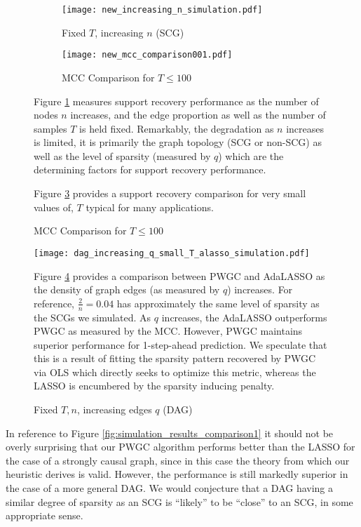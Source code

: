 \begin{figure}
  \centering
  \caption{PWGC Scaling and Small Sample Performance}
  \label{fig:simulation_results_scaling_and_small_T}
  \begin{subfigure}[b]{0.45\textwidth}
    \caption{Fixed $T$, increasing $n$ (SCG)}
    \label{fig:simulation_results_scaling}
    \texttt{[image: new\_increasing\_n\_simulation.pdf]}
  \end{subfigure}
  \begin{subfigure}[b]{0.45\textwidth}
    \caption{MCC Comparison for $T \le 100$}
    \label{fig:small_T_comparison}
    \texttt{[image: new\_mcc\_comparison001.pdf]}
  \end{subfigure}

  {\footnotesize Figure \ref{fig:simulation_results_scaling} measures
    support recovery performance as the number of nodes $n$ increases,
    and the edge proportion as well as the number of samples $T$ is
    held fixed.  Remarkably, the degradation as $n$ increases is
    limited, it is primarily the graph topology (SCG or non-SCG) as
    well as the level of sparsity (measured by $q$) which are the
    determining factors for support recovery performance.

    Figure \ref{fig:small_T_comparison} provides a support recovery
    comparison for very small values of, $T$ typical for many
    applications.}
\end{figure}

\begin{figure}
  \caption{Fixed $T, n$, increasing edges $q$ (DAG)}
  \label{fig:simulation_results_dense}
  \texttt{[image: dag\_increasing\_q\_small\_T\_alasso\_simulation.pdf]}

  {\footnotesize Figure \ref{fig:simulation_results_dense} provides a
    comparison between PWGC and AdaLASSO as the density of graph edges
    (as measured by $q$) increases.  For reference,
    $\frac{2}{n} = 0.04$ has approximately the same level of sparsity
    as the SCGs we simulated.  As $q$ increases, the AdaLASSO
    outperforms PWGC as measured by the MCC.  However, PWGC maintains
    superior performance for 1-step-ahead prediction.  We speculate
    that this is a result of fitting the sparsity pattern recovered by
    PWGC via OLS which directly seeks to optimize this metric, whereas
    the LASSO is encumbered by the sparsity inducing penalty.}
\end{figure}

In reference to Figure \ref{fig:simulation_results_comparison1} it
should not be overly surprising that our PWGC algorithm performs
better than the LASSO for the case of a strongly causal graph, since
in this case the theory from which our heuristic derives is valid.
However, the performance is still markedly superior in the case of a
more general DAG.  We would conjecture that a DAG having a similar
degree of sparsity as an SCG is ``likely'' to be ``close'' to an SCG,
in some appropriate sense.

